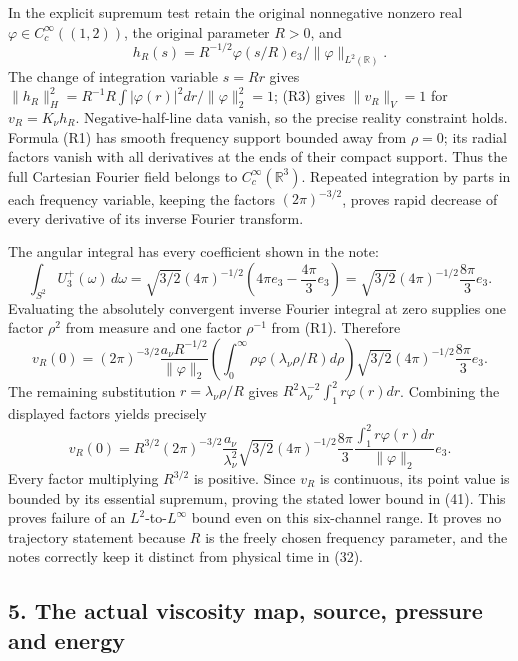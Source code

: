 In the explicit supremum test retain the original nonnegative nonzero real \(\varphi\in C_c^\infty((1,2))\), the original parameter \(R>0\), and \[
h_R(s)=R^{-1/2}\varphi(s/R)e_3/\|\varphi\|_{L^2(\mathbb R)}.
\] The change of integration variable \(s=Rr\) gives \(\|h_R\|_H^2=R^{-1}R\int|\varphi(r)|^2dr/\|\varphi\|_2^2=1\); (R3) gives \(\|v_R\|_V=1\) for \(v_R=K_\nu h_R\). Negative-half-line data vanish, so the precise reality constraint holds. Formula (R1) has smooth frequency support bounded away from \(\rho=0\); its radial factors vanish with all derivatives at the ends of their compact support. Thus the full Cartesian Fourier field belongs to \(C_c^\infty(\mathbb R^3)\). Repeated integration by parts in each frequency variable, keeping the factors \((2\pi)^{-3/2}\), proves rapid decrease of every derivative of its inverse Fourier transform.

The angular integral has every coefficient shown in the note: \[
\int_{S^2}U_3^+(\omega)\,d\omega
=\sqrt{3/2}(4\pi)^{-1/2}
\left(4\pi e_3-\frac{4\pi}{3}e_3\right)
=\sqrt{3/2}(4\pi)^{-1/2}\frac{8\pi}{3}e_3.
\] Evaluating the absolutely convergent inverse Fourier integral at zero supplies one factor \(\rho^2\) from measure and one factor \(\rho^{-1}\) from (R1). Therefore \[
v_R(0)=(2\pi)^{-3/2}
\frac{a_\nu R^{-1/2}}{\|\varphi\|_2}
\left(\int_0^\infty\rho\varphi(\lambda_\nu\rho/R)d\rho\right)
\sqrt{3/2}(4\pi)^{-1/2}\frac{8\pi}{3}e_3.
\] The remaining substitution \(r=\lambda_\nu\rho/R\) gives \(R^2\lambda_\nu^{-2}\int_1^2r\varphi(r)dr\). Combining the displayed factors yields precisely \[
v_R(0)=R^{3/2}(2\pi)^{-3/2}\frac{a_\nu}{\lambda_\nu^2}
\sqrt{3/2}(4\pi)^{-1/2}\frac{8\pi}{3}
\frac{\int_1^2r\varphi(r)dr}{\|\varphi\|_2}e_3.
\tag{R21}
\] Every factor multiplying \(R^{3/2}\) is positive. Since \(v_R\) is continuous, its point value is bounded by its essential supremum, proving the stated lower bound in (41). This proves failure of an \(L^2\)-to-\(L^\infty\) bound even on this six-channel range. It proves no trajectory statement because \(R\) is the freely chosen frequency parameter, and the notes correctly keep it distinct from physical time in (32).

\subsection*{5. The actual viscosity map, source, pressure and energy}

